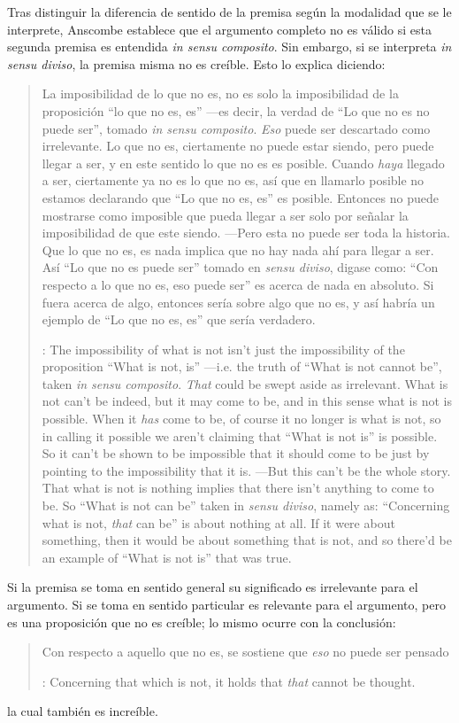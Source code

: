 Tras distinguir la diferencia de sentido de la premisa según la modalidad que se le interprete, Anscombe establece que el argumento completo no es válido si esta segunda premisa es entendida \emph{in sensu composito}. Sin embargo, si se interpreta \emph{in sensu diviso}, la premisa misma no es creíble. Esto lo explica diciendo: \blockquote[{\cite[vii]{anscombe1981parmenides}}: The impossibility of what is not isn't just the impossibility of the proposition ``What is not, is'' ---i.e. the truth of ``What is not cannot be'', taken \emph{in sensu composito}. \emph{That} could be swept aside as irrelevant. What is not can't be indeed, but it may come to be, and in this sense what is not is possible. When it \emph{has} come to be, of course it no longer is what is not, so in calling it possible we aren't claiming that ``What is not is'' is possible. So it can't be shown to be impossible that it should come to be just by pointing to the impossibility that it is. ---But this can't be the whole story. That what is not is nothing implies that there isn't anything to come to be. So ``What is not can be'' taken in \emph{sensu diviso}, namely as: ``Concerning what is not, \emph{that} can be'' is about nothing at all. If it were about something, then it would be about something that is not, and so there'd be an example of ``What is not is'' that was true.]{La imposibilidad de lo que no es, no es solo la imposibilidad de la proposición ``lo que no es, es'' ---es decir, la verdad de ``Lo que no es no puede ser'', tomado \emph{in sensu composito}. \emph{Eso} puede ser descartado como irrelevante. Lo que no es, ciertamente no puede estar siendo, pero puede llegar a ser, y en este sentido lo que no es es posible. Cuando \emph{haya} llegado a ser, ciertamente ya no es lo que no es, así que en llamarlo posible no estamos declarando que ``Lo que no es, es'' es posible. Entonces no puede mostrarse como imposible que pueda llegar a ser solo por señalar la imposibilidad de que este siendo. ---Pero esta no puede ser toda la historia. Que lo que no es, es nada implica que no hay nada ahí para llegar a ser. Así ``Lo que no es puede ser'' tomado en \emph{sensu diviso}, digase como: ``Con respecto a lo que no es, eso puede ser'' es acerca de nada en absoluto. Si fuera acerca de algo, entonces sería sobre algo que no es, y así habría un ejemplo de ``Lo que no es, es'' que sería verdadero.} Si la premisa se toma en sentido general su significado es irrelevante para el argumento. Si se toma en sentido particular es relevante para el argumento, pero es una proposición que no es creíble; lo mismo ocurre con la conclusión: \blockquote[{\cite[3]{anscombe1981parmenides:pmc}}: Concerning that which is not, it holds that \emph{that} cannot be thought.]{Con respecto a aquello que no es, se sostiene que \emph{eso} no puede ser pensado} la cual también es increíble.

